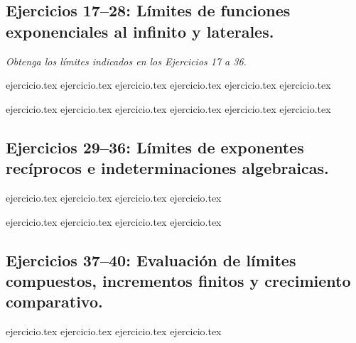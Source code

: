 \subsection*{Ejercicios 17--28: Límites de funciones exponenciales al infinito y laterales.}

\noindent \textit{Obtenga los límites indicados en los Ejercicios 17 a 36.}

\begin{enumerate}
    \setcounter{enumi}{16}
    \begin{minipage}{0.45\textwidth}
    {ejercicio.tex}
    {ejercicio.tex}
    {ejercicio.tex}
    {ejercicio.tex}
    {ejercicio.tex}
    {ejercicio.tex}
    \end{minipage}%
    \begin{minipage}{0.45\textwidth}
    {ejercicio.tex}
    {ejercicio.tex}
    {ejercicio.tex}
    {ejercicio.tex}
    {ejercicio.tex}
    {ejercicio.tex}
    \end{minipage}
\end{enumerate}

\subsection*{Ejercicios 29--36: Límites de exponentes recíprocos e indeterminaciones algebraicas.}

\begin{enumerate}
    \setcounter{enumi}{28}
    \begin{minipage}{0.45\textwidth}
    {ejercicio.tex}
    {ejercicio.tex}
    {ejercicio.tex}
    {ejercicio.tex}
    \end{minipage}%
    \begin{minipage}{0.45\textwidth}
    {ejercicio.tex}
    {ejercicio.tex}
    {ejercicio.tex}
    {ejercicio.tex}
    \end{minipage}
\end{enumerate}

\subsection*{Ejercicios 37--40: Evaluación de límites compuestos, incrementos finitos y crecimiento comparativo.}

\begin{enumerate}
    \setcounter{enumi}{36}
    {ejercicio.tex}
    {ejercicio.tex}
    {ejercicio.tex}
    {ejercicio.tex}
\end{enumerate}
